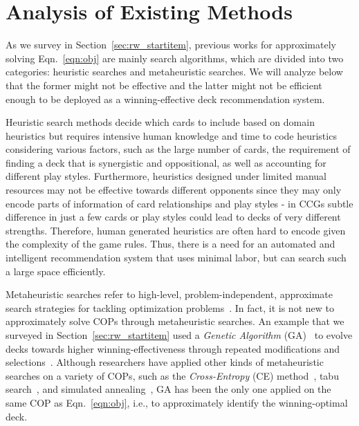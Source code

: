 \section{Analysis of Existing Methods}\label{sec:qdeckrec_existmethodanaly}
As we survey in Section~\ref{sec:rw_startitem}, previous works for approximately solving Eqn.~\ref{eqn:obj} are mainly search algorithms, which are divided into two categories: heuristic searches and metaheuristic searches. We will analyze below that the former might not be effective and the latter might not be efficient enough to be deployed as a winning-effective deck recommendation system.

Heuristic search methods decide which cards to include based on domain heuristics but requires intensive human knowledge and time to code heuristics considering various factors, such as the large number of cards, the requirement of finding a deck that is synergistic and oppositional, as well as accounting for different play styles. Furthermore, heuristics designed under limited manual resources may not be effective towards different opponents since they may only encode parts of information of card relationships and play styles - in CCGs subtle difference in just a few cards or play styles could lead to decks of very different strengths. Therefore, human generated heuristics are often hard to encode given the complexity of the game rules. Thus, there is a need for an automated and intelligent recommendation system that uses minimal labor, but can search such a large space efficiently. 

Metaheuristic searches refer to high-level, problem-independent, approximate search strategies for tackling optimization problems~\citep{birattari2009tuning}. In fact, it is not new to approximately solve COPs through metaheuristic searches. An example that we surveyed in Section~\ref{sec:rw_startitem} used a \textit{Genetic Algorithm} (GA)~\citep{holland1992adaptation} to evolve decks towards higher winning-effectiveness through repeated modifications and selections~\citep{garcia2016evolutionary,bjorke2017deckbuilding}. Although researchers have applied other kinds of metaheuristic searches on a variety of COPs, such as the \textit{Cross-Entropy} (CE) method~\citep{rubinstein1999cross}, tabu search~\citep{glover1986future}, and simulated annealing~\citep{kirkpatrick1983optimization}, GA has been the only one applied on the same COP as Eqn.~\ref{eqn:obj}, i.e., to approximately identify the winning-optimal deck. 


